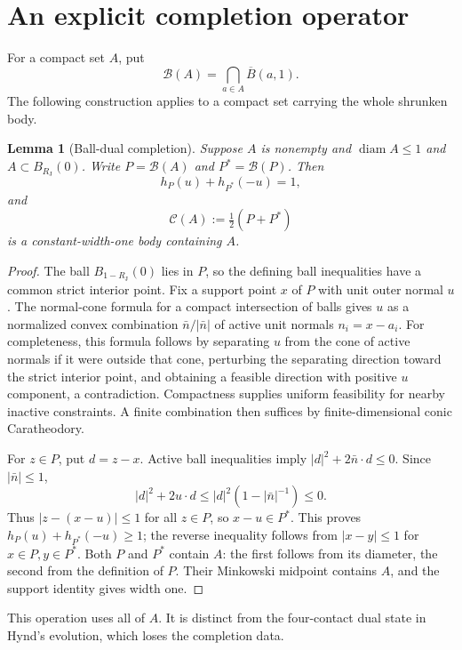 \documentclass[11pt]{article}
\newtheorem{lemma}[theorem]{Lemma}
\theoremstyle{remark}\newtheorem{remark}[theorem]{Remark}
\newcommand{\RJ}{R_{\mathrm J}}
\newcommand{\B}{\mathcal B}
\begin{document}
\section{An explicit completion operator}
For a compact set $A$, put
\[
 \B(A)=\bigcap_{a\in A}\overline B(a,1).
\]
The following construction applies to a compact set carrying the whole shrunken body.

\begin{lemma}[Ball-dual completion]\label{completion:completion}
Suppose $A$ is nonempty and $\operatorname{diam}A\leq1$ and $A\subset B_{\RJ}(0)$. Write
$P=\B(A)$ and $P^*=\B(P)$. Then
\[
 h_P(u)+h_{P^*}(-u)=1,
\]
and
\begin{equation}\label{completion:operator}
 \mathcal C(A):=\tfrac12(P+P^*)
\end{equation}
is a constant-width-one body containing $A$.
\end{lemma}
\begin{proof}
The ball $B_{1-\RJ}(0)$ lies in $P$, so the defining ball inequalities have a common strict interior point. Fix a support point $x$ of $P$ with unit outer normal $u$. The normal-cone formula for a compact intersection of balls gives $u$ as a normalized convex combination $\bar n/|\bar n|$ of active unit normals $n_i=x-a_i$.
For completeness, this formula follows by separating $u$ from the cone of active normals if it were outside that cone, perturbing the separating direction toward the strict interior point, and obtaining a feasible direction with positive $u$ component, a contradiction. Compactness supplies uniform feasibility for nearby inactive constraints. A finite combination then suffices by finite-dimensional conic Caratheodory.

For $z\in P$, put $d=z-x$. Active ball inequalities imply
$|d|^2+2\bar n\cdot d\leq0$. Since $|\bar n|\leq1$,
\[
 |d|^2+2u\cdot d\leq |d|^2(1-|\bar n|^{-1})\leq0.
\]
Thus $|z-(x-u)|\leq1$ for all $z\in P$, so $x-u\in P^*$.
This proves $h_P(u)+h_{P^*}(-u)\geq1$; the reverse inequality follows from $|x-y|\leq1$ for $x\in P,y\in P^*$. Both $P$ and $P^*$ contain $A$: the first follows from its diameter, the second from the definition of $P$. Their Minkowski midpoint contains $A$, and the support identity gives width one.
\end{proof}
This operation uses all of $A$. It is distinct from the four-contact dual state in Hynd's evolution, which loses the completion data.
\end{document}
